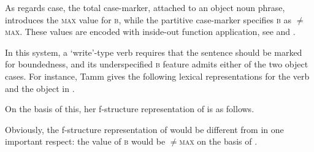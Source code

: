 \documentclass[output=paper,hidelinks]{langscibook}
\begin{document}
\ea%
    \label{ex:FinnoUgric:30}
    \z

\ea%
    \label{ex:FinnoUgric:31}
\z

As regards case, the total case-marker, attached to an object noun phrase, introduces the \textsc{max} value for \textsc{b}, while the partitive case-marker specifies \textsc{b} as ${\neq}$\textsc{max}. These values are encoded with inside-out function application, see  and .

\ea%
    \label{ex:FinnoUgric:32}
    \z

\ea%
    \label{ex:FinnoUgric:33}
    \z
In this system, a `write'-type verb requires that the sentence should be marked for boundedness, and its underspecified \textsc{b} feature admits either of the two object cases. For instance, Tamm gives the following lexical representations for the verb and the object in .


\ea%
    \label{ex:FinnoUgric:34}
\z

\ea%
    \label{ex:FinnoUgric:35}
\z
On the basis of this, her f-structure representation of  is as follows.

\ea%
    \label{ex:FinnoUgric:36}
    \z
Obviously, the f-structure representation of  would be different from  in one important respect: the value of \textsc{b} would be ${\neq}$\textsc{max} on the basis of .
\end{document}
